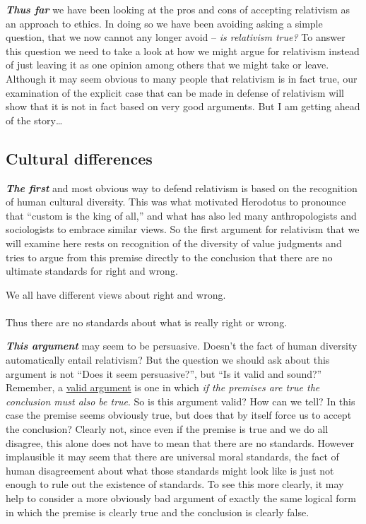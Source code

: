 \documentclass[
  12pt, openany]{book}
\theoremstyle{definition}
\theoremstyle{definition}
\theoremstyle{definition}
\theoremstyle{definition}
\theoremstyle{remark}
\begin{document}
\textbf{\emph{Thus far}} we have been looking at the pros and cons of accepting relativism as an approach to ethics. In doing so we have been avoiding asking a simple question, that we now cannot any longer avoid -- \emph{is relativism true?} To answer this question we need to take a look at how we might argue for relativism instead of just leaving it as one opinion among others that we might take or leave. Although it may seem obvious to many people that relativism is in fact true, our examination of the explicit case that can be made in defense of relativism will show that it is not in fact based on very good arguments. But I am getting ahead of the story\ldots{}

\hypertarget{cultural-differences}{%
\subsection*{Cultural differences}\label{cultural-differences}}


\textbf{\emph{The first}} and most obvious way to defend relativism is based on the recognition of human cultural diversity. This was what motivated Herodotus to pronounce that ``custom is the king of all,'' and what has also led many anthropologists and sociologists to embrace similar views. So the first argument for relativism that we will examine here rests on recognition of the diversity of value judgments and tries to argue from this premise directly to the conclusion that there are no ultimate standards for right and wrong.

\begin{center}

\begin{argument}
We all have different views about right and wrong.\\
~\\
Thus there are no standards about what is really right or wrong.

\end{argument}


\end{center}

\textbf{\emph{This argument}} may seem to be persuasive. Doesn't the fact of human diversity automatically entail relativism? But the question we should ask about this argument is not ``Does it seem persuasive?'', but ``Is it valid and sound?'' Remember, a \protect\hyperlink{key-concepts}{valid argument} is one in which \emph{if the premises are true the conclusion must also be true}. So is this argument valid? How can we tell? In this case the premise seems obviously true, but does that by itself force us to accept the conclusion? Clearly not, since even if the premise is true and we do all disagree, this alone does not have to mean that there are no standards. However implausible it may seem that there are universal moral standards, the fact of human disagreement about what those standards might look like is just not enough to rule out the existence of standards. To see this more clearly, it may help to consider a more obviously bad argument of exactly the same logical form in which the premise is clearly true and the conclusion is clearly false.
\end{document}
